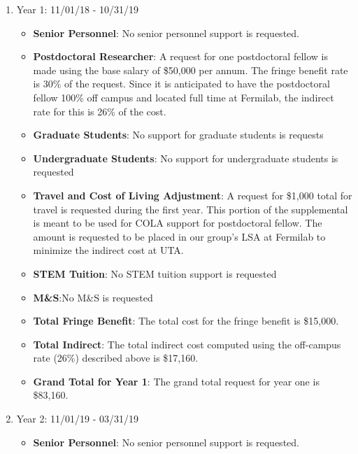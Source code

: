 \begin{enumerate}
\begin{itemize}
\end{itemize}

\item{Year 1: 11/01/18 - 10/31/19}
\begin{itemize}[noitemsep,nolistsep]
\item{{\bf Senior Personnel}: No senior personnel support is requested.}

\item {{\bf Postdoctoral Researcher}: A request for one postdoctoral fellow is made using the base salary of \$50,000 per annum.  The fringe benefit rate is 30\% of the request. Since it is anticipated to have the postdoctoral fellow 100\% off campus and located full time at Fermilab, the indirect rate for this is 26\% of the cost.} 


\item{{\bf Graduate Students}: No support for graduate students is requests}

\item {{\bf Undergraduate Students}: No support for undergraduate students is requested}

\item{{\bf Travel and Cost of Living Adjustment}: A request for \$1,000 total for travel is requested during the first year.  This portion of the supplemental is meant to be used for COLA support for postdoctoral fellow. The amount is requested to be placed in our group’s LSA at Fermilab to minimize the indirect cost at UTA.}

\item {{\bf STEM Tuition}: No STEM tuition support is requested}

\item {{\bf M\&S}:No M\&S is requested}

\item {{\bf Total Fringe Benefit}: The total cost for the fringe benefit is \$15,000.}

\item {{\bf Total Indirect}: The total indirect cost computed using the off-campus rate (26\%) described above is \$17,160.}

\item {{\bf Grand Total for Year 1}: The grand total request for year one is \$83,160.}

\end{itemize}

\item{Year 2: 11/01/19 - 03/31/19}
\begin{itemize}[noitemsep,nolistsep]
\item{{\bf Senior Personnel}: No senior personnel support is requested.}


\end{itemize}
\end{enumerate}
